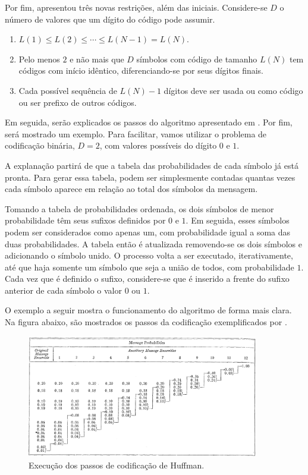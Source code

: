 \documentclass[cic,tc]{iiufrgs}
\begin{document}
Por fim, \citet{HuffmanCoding} apresentou três novas restrições, além das iniciais.
Considere-se $D$ o número de valores que um dígito do código pode assumir.
\begin{enumerate}
    \item $L(1) \le L(2) \le \cdots \le L(N-1) = L(N)$.
    \item Pelo menos $2$ e não mais que $D$ símbolos com código de tamanho $L(N)$ tem códigos 
    com início idêntico, diferenciando-se por seus dígitos finais.
    \item Cada possível sequência de $L(N)-1$ dígitos deve ser usada ou como código ou ser 
    prefixo de outros códigos.
\end{enumerate}

Em seguida, serão explicados os passos do algoritmo apresentado em \citet{HuffmanCoding}.
Por fim, será mostrado um exemplo.
Para facilitar, vamos utilizar o problema de codificação binária, $D=2$, com valores 
possíveis do dígito $0$ e $1$.

A explanação partirá de que a tabela das probabilidades de cada símbolo já está pronta.
Para gerar essa tabela, podem ser simplesmente contadas quantas vezes cada símbolo aparece
em relação ao total dos símbolos da mensagem.

Tomando a tabela de probabilidades ordenada, os dois símbolos de menor probabilidade 
têm seus sufixos definidos por $0$ e $1$.
Em seguida, esses símbolos podem ser considerados como apenas um, com probabilidade igual 
a soma das duas probabilidades. 
A tabela então é atualizada removendo-se os dois símbolos e adicionando o símbolo unido. 
O processo volta a ser executado, iterativamente, até que haja somente um símbolo que seja 
a união de todos, com probabilidade $1$.
Cada vez que é definido o sufixo, considere-se que é inserido a frente do sufixo anterior 
de cada símbolo o valor $0$ ou $1$.

O exemplo a seguir mostra o funcionamento do algoritmo de forma mais clara.
Na figura abaixo, são mostrados os passos da codificação exemplificados por 
\citet{HuffmanCoding}.

\begin{figure}[H]
    \caption{Execução dos passos de codificação de Huffman.}
    \begin{center}
        \includegraphics[width=0.9\textwidth]{img/huffmanprocess.png}
    \end{center}
\end{figure}
\end{document}
